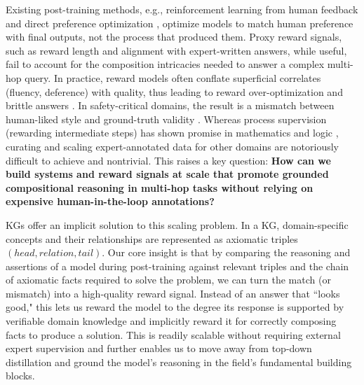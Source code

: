 \documentclass{article}
\theoremstyle{plain}
\theoremstyle{definition}
\theoremstyle{remark}
\begin{document}
Existing post-training methods, e.g., reinforcement learning from human feedback \cite{ouyang2022training} and 
direct preference optimization \cite{Rafailov2023DirectModel}, optimize models to match human preference with final outputs, not the process that produced them. Proxy reward signals, such as reward length and alignment with expert-written answers, while useful, fail to account for the composition intricacies needed to answer a complex multi-hop query. In practice, reward models often conflate superficial correlates (fluency, deference) with quality, thus leading to reward over-optimization and brittle answers \citep{Shrivastava2025SampleReasoning}. In safety-critical domains, the result is a mismatch between human-liked style and ground-truth validity \citep{DamaniBEYONDUNCERTAINTY, RewardLilLog, Rafailov2023DirectModel}. Whereas process supervision (rewarding intermediate steps) has shown promise in mathematics and logic \cite{Zhang2025TheReasoning, CuiPROCESSREWARDS, Wang2025HierarchicalModel, LightmanLetsStep}, curating and scaling expert-annotated data for other domains are notoriously difficult to achieve and nontrivial. This raises a key question: \textbf{How can we build systems and reward signals at scale that promote grounded compositional reasoning in multi-hop tasks without relying on expensive human-in-the-loop annotations?}

KGs offer an implicit solution to this scaling problem. In a KG, domain-specific concepts and their relationships are represented as axiomatic triples $(head, relation, tail)$. Our core insight is that by comparing the reasoning and assertions of a model during post-training against relevant triples and the chain of axiomatic facts required to solve the problem, we can turn the match (or mismatch) into a high-quality reward signal. Instead of an answer that ``looks good," this lets us reward the model to the degree its response is supported by verifiable domain knowledge and implicitly reward it for correctly composing facts to produce a solution. This is readily scalable without requiring external expert supervision and further enables us to move away from top-down distillation and ground the model’s reasoning in the field's fundamental building blocks.
\end{document}
